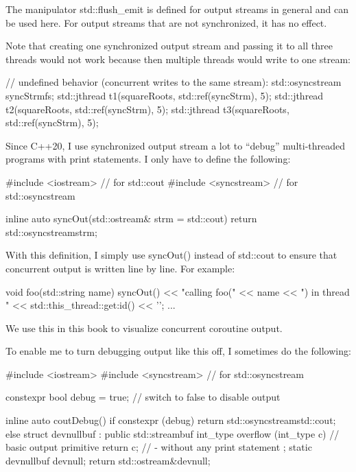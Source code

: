 The manipulator std::flush\_emit is defined for output streams in general and can be used here. For output streams that are not synchronized, it has no effect.

Note that creating one synchronized output stream and passing it to all three threads would not work because then multiple threads would write to one stream:

\begin{cpp}
// undefined behavior (concurrent writes to the same stream):
std::osyncstream syncStrm{fs};
std::jthread t1(squareRoots, std::ref(syncStrm), 5);
std::jthread t2(squareRoots, std::ref(syncStrm), 5);
std::jthread t3(squareRoots, std::ref(syncStrm), 5);
\end{cpp}


Since C++20, I use synchronized output stream a lot to “debug” multi-threaded programs with print statements. I only have to define the following:

\begin{cpp}
#include <iostream> // for std::cout
#include <syncstream> // for std::osyncstream

inline auto syncOut(std::ostream& strm = std::cout) {
	return std::osyncstream{strm};
}
\end{cpp}

With this definition, I simply use syncOut() instead of std::cout to ensure that concurrent output is written line by line. For example:

\begin{cpp}
void foo(std::string name) {
	syncOut() << "calling foo(" << name
			  << ") in thread " << std::this_thread::get:id() << '\n';
	...
}
\end{cpp}

We use this in this book to visualize concurrent coroutine output.

To enable me to turn debugging output like this off, I sometimes do the following:

\begin{cpp}
#include <iostream>
#include <syncstream> // for std::osyncstream

constexpr bool debug = true; // switch to false to disable output

inline auto coutDebug() {
	if constexpr (debug) {
		return std::osyncstream{std::cout};
	}
	else {
		struct devnullbuf : public std::streambuf {
			int_type overflow (int_type c) { // basic output primitive
				return c; // - without any print statement
			}
		};
		static devnullbuf devnull;
		return std::ostream{&devnull};
	}
}
\end{cpp}















